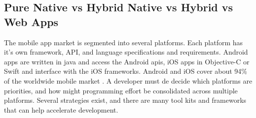 \subsection{Pure Native vs Hybrid Native vs Hybrid vs Web Apps}

The mobile app market is segmented into several platforms. Each platform has it’s own framework, API, and language specifications and requirements. Android apps are written in java and access the Android apis, iOS apps in Objective-C or Swift and interface with the iOS frameworks. Android and iOS cover about 94\% of the worldwide mobile market \cite{mobile_market}. A developer must de decide which platforms are priorities, and how might programming effort be consolidated across multiple platforms. Several strategies exist, and there are many tool kits and frameworks that can help accelerate development.

